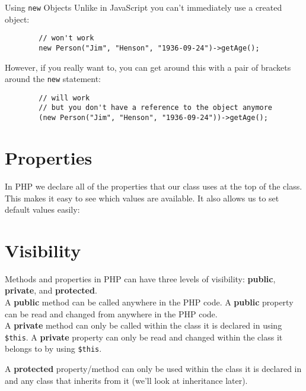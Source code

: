 \begin{infobox}{Using \texttt{new} Objects}
    Unlike in JavaScript you can't immediately use a created object:

    \begin{verbatim}
        // won't work
        new Person("Jim", "Henson", "1936-09-24")->getAge();
    \end{verbatim}

    However, if you really want to, you can get around this with a pair of brackets around the \texttt{new} statement:

    \begin{verbatim}
        // will work
        // but you don't have a reference to the object anymore
        (new Person("Jim", "Henson", "1936-09-24"))->getAge();
    \end{verbatim}
\end{infobox}




\section{Properties}

In PHP we declare all of the properties that our class uses at the top of the class. This makes it easy to see which values are available. It also allows us to set default values easily:



\section{Visibility}

Methods and properties in PHP can have three levels of visibility: \textbf{public}, \textbf{private}, and \textbf{protected}.
\\

A \textbf{public} method can be called anywhere in the PHP code. A \textbf{public} property can be read and changed from anywhere in the PHP code.
\\

A \textbf{private} method can only be called within the class it is declared in using \texttt{\$this}. A \textbf{private} property can only be read and changed within the class it belongs to by using \texttt{\$this}.


A \textbf{protected} property/method can only be used within the class it is declared in and any class that inherits from it (we'll look at inheritance later).
\\

